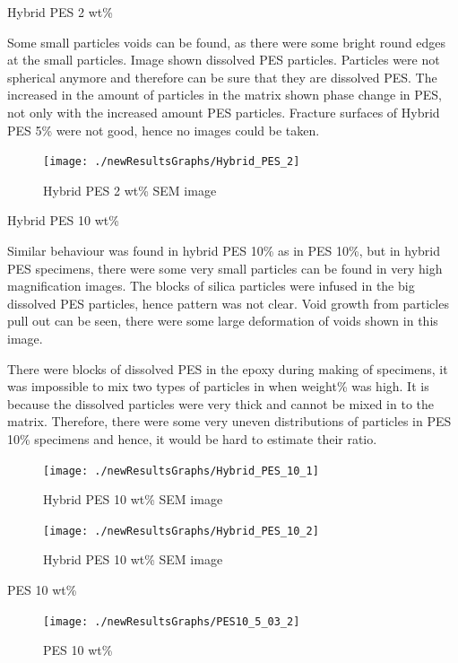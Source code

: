 \documentclass[numbers=noendperiod,chapterprefix=on]{icldt} %
\begin{document}
{Hybrid PES 2 wt\%

Some small particles voids can be found, as there were some bright round edges at the small particles. Image shown dissolved PES particles. Particles were not spherical anymore and therefore can be sure that they are dissolved PES. The increased in the amount of particles in the matrix shown phase change in PES, not only with the increased amount PES particles.
Fracture surfaces of Hybrid PES 5\% were not good, hence no images could be taken.
 
\begin{figure}[!hp]
\centering
\texttt{[image: ./newResultsGraphs/Hybrid\_PES\_2]}
\caption{Hybrid PES 2 wt\% SEM image} \label{Hybrid_PES_2}
\end{figure}
\FloatBarrier

Hybrid PES 10 wt\%

Similar behaviour was found in hybrid PES 10\% as in PES 10\%, but in hybrid PES specimens, there were some very small particles can be found in very high magnification images. The blocks of silica particles were infused in the big dissolved PES particles, hence pattern was not clear. Void growth from particles pull out can be seen, there were some large deformation of voids shown in this image.

There were blocks of dissolved PES in the epoxy during making of specimens, it was impossible to mix two types of particles in when weight\% was high. It is because the dissolved particles were very thick and cannot be mixed in to the matrix. Therefore, there were some very uneven distributions of particles in PES 10\% specimens and hence, it would be hard to estimate their ratio. 

\begin{figure}[!hp]
\centering
\texttt{[image: ./newResultsGraphs/Hybrid\_PES\_10\_1]}
\caption{Hybrid PES 10 wt\% SEM image} \label{Hybrid_PES_10_1}
\end{figure}
\FloatBarrier

\begin{figure}[!hp]
\centering
\texttt{[image: ./newResultsGraphs/Hybrid\_PES\_10\_2]}
\caption{Hybrid PES 10 wt\% SEM image} \label{Hybrid_PES_10_2}
\end{figure}
\FloatBarrier

PES 10 wt\%

\begin{figure}[!hp]
\centering
\texttt{[image: ./newResultsGraphs/PES10\_5\_03\_2]}
\caption{PES 10 wt\%} \label{PES10_5_03_2}
\end{figure}
\FloatBarrier

}
\end{document}
